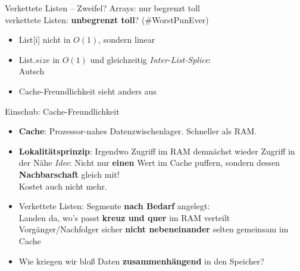 \begin{frame}{Verkettete Listen – Zweifel?}
	Arrays:  nur begrenzt toll \\
			 verkettete Listen: \textbf{unbegrenzt toll}? \quad (\#WorstPunEver)
	\pause
	\begin{itemize}
		\item[\Cons] List[i] nicht in $O(1)$, sondern linear
		\pause
		\item[\Cons] List.$size$ in $O(1)$ \; und gleichzeitig \; \textit{Inter-List-Splice}: \\
		Autsch
		\pause
		\item[\Cons] Cache-Freundlichkeit sieht anders aus
	\end{itemize}
\end{frame}

\begin{frame}{Einschub: Cache-Freundlichkeit}
	\begin{itemize}
		\item \textbf{Cache}: Prozessor-nahes Datenzwischenlager. Schneller als RAM.
		\pause
		\item \textbf{Lokalitätsprinzip}: Irgendwo Zugriff im RAM \impl demnächst wieder Zugriff in der Nähe
		\pause
		\implitem \textit{Idee}: Nicht nur \textbf{einen} Wert im Cache puffern, sondern dessen \textbf{Nachbarschaft} gleich mit! \\
		Kostet auch nicht mehr.
		\pause
		\item Verkettete Listen: Segmente \textbf{nach Bedarf} angelegt: \\ Landen da, wo's passt \impl \textbf{kreuz und quer} im RAM verteilt
		\pause 
		\implitem Vorgänger/Nachfolger sicher \textbf{nicht nebeneinander} \impl selten gemeinsam im Cache
		\pause
		\item Wie kriegen wir bloß Daten \textbf{zusammenhängend} in den Speicher?
		
	\end{itemize}
\end{frame}

